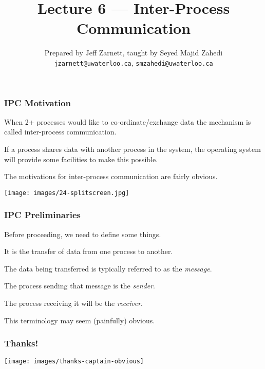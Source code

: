 

\title{Lecture 6 --- Inter-Process Communication}

\author{Prepared by Jeff Zarnett, taught by Seyed Majid Zahedi \\ \small \texttt{jzarnett@uwaterloo.ca}, \texttt{smzahedi@uwaterloo.ca}}
\date{}




\begin{frame}
	\titlepage

\end{frame}

\begin{frame}
	\frametitle{IPC Motivation}

	When 2+ processes would like to co-ordinate/exchange data the mechanism is called \alert{inter-process communication}.

	If a process shares data with another process in the system, the operating system will provide some facilities to make this possible.

	The motivations for inter-process communication are fairly obvious.

	\begin{center}
		\texttt{[image: images/24-splitscreen.jpg]}
	\end{center}

\end{frame}


\begin{frame}
	\frametitle{IPC Preliminaries}

	Before proceeding, we need to define some things.

	It is the transfer of data from one process to another.

	The data being transferred is typically referred to as the \textit{message}.

	The process sending that message is the \textit{sender}.

	The process receiving it will be the \textit{receiver}.

	This terminology may seem (painfully) obvious.

\end{frame}


\begin{frame}
	\frametitle{Thanks!}

	\begin{center}
		\texttt{[image: images/thanks-captain-obvious]}
	\end{center}


\end{frame}


